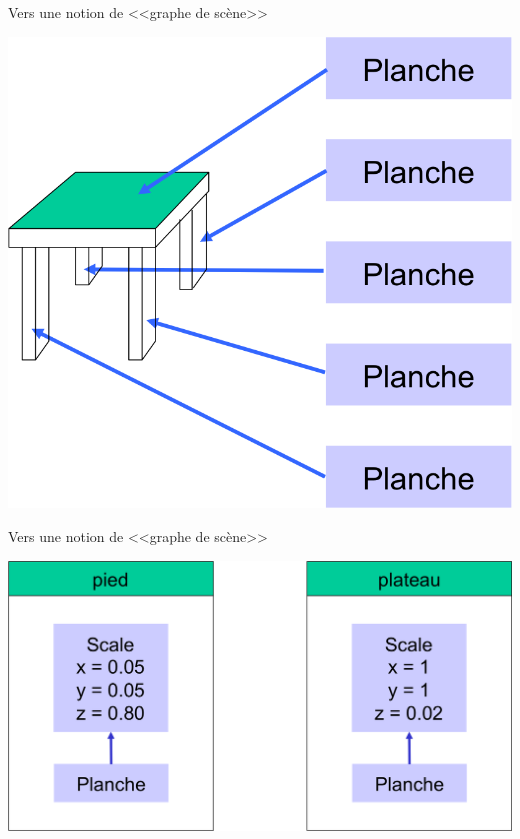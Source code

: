 \begin{frame}{Vers une notion de <<graphe de scène>>}
\begin{center}
\includegraphics[height=.8\textheight]{figs/table.png}
\end{center}
\end{frame}

\begin{frame}{Vers une notion de <<graphe de scène>>}
\begin{center}
\includegraphics[height=.6\textheight]{figs/table2.png}
\end{center}
\end{frame}

